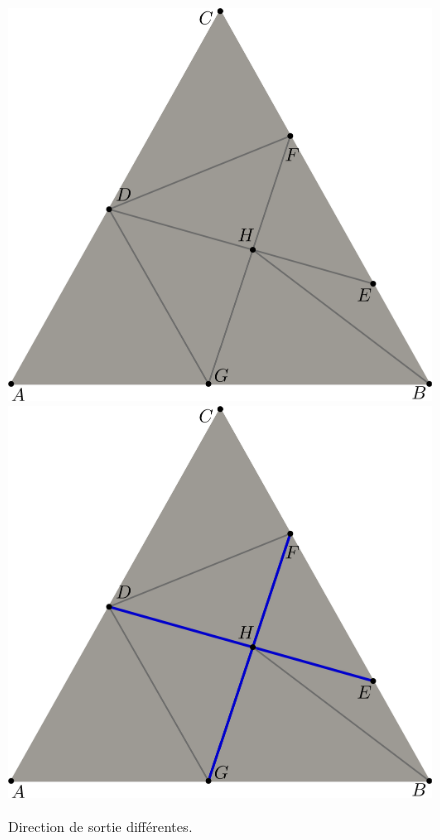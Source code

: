 \begin{figure}[h!]
\centering
\includegraphics[scale=0.275]{images/retournement_arete-1.pdf}\hfill
\includegraphics[scale=0.275]{images/retournement_arete-2.pdf}
\caption{Direction de sortie différentes.}
\label{fig:retournement_arete}
\end{figure}


